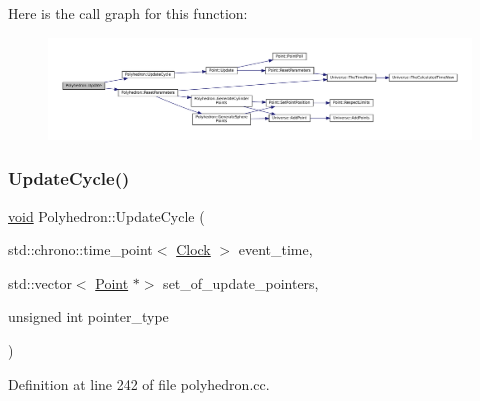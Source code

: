 Here is the call graph for this function\+:\nopagebreak
\begin{figure}[H]
\begin{center}
\leavevmode
\includegraphics[width=350pt]{class_polyhedron_a5fdc8c91719799904b8a1ccef535a42c_cgraph}
\end{center}
\end{figure}
\mbox{\label{class_polyhedron_a6b26174513703bc2b13f69b9cd8e1a48}} 
\subsubsection{\texorpdfstring{Update\+Cycle()}{UpdateCycle()}}
{\footnotesize\ttfamily \mbox{\hyperlink{glad_8h_a950fc91edb4504f62f1c577bf4727c29}{void}} Polyhedron\+::\+Update\+Cycle (\begin{DoxyParamCaption}\item[{std\+::chrono\+::time\+\_\+point$<$ \mbox{\hyperlink{universe_8h_a0ef8d951d1ca5ab3cfaf7ab4c7a6fd80}{Clock}} $>$}]{event\+\_\+time,  }\item[{std\+::vector$<$ \mbox{\hyperlink{class_point}{Point}} $\ast$$>$}]{set\+\_\+of\+\_\+update\+\_\+pointers,  }\item[{unsigned int}]{pointer\+\_\+type }\end{DoxyParamCaption})}



Definition at line 242 of file polyhedron.\+cc.

